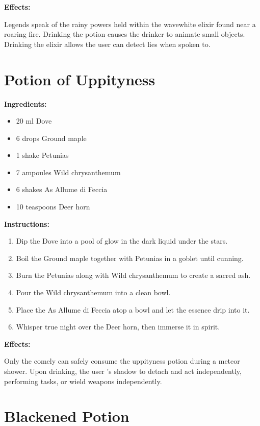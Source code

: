 \documentclass{article}
\begin{document}
\textbf{Effects:}

Legends speak of the rainy powers held within the wavewhite elixir found near a roaring fire. Drinking the potion causes the drinker to animate small objects. Drinking the elixir allows the user can detect lies when spoken to.

\newpage
\section*{Potion of Uppityness}

\textbf{Ingredients:}

\begin{itemize}
  \item 20 ml Dove
  \item 6 drops Ground maple
  \item 1 shake Petunias
  \item 7 ampoules Wild chrysanthemum
  \item 6 shakes As Allume di Feccia
  \item 10 teaspoons Deer horn
\end{itemize}

\textbf{Instructions:}

\begin{enumerate}
  \item Dip the Dove into a pool of glow in the dark liquid under the stars.
  \item Boil the Ground maple together with Petunias in a goblet until cunning.
  \item Burn the Petunias along with Wild chrysanthemum to create a sacred ash.
  \item Pour the Wild chrysanthemum into a clean bowl.
  \item Place the As Allume di Feccia atop a bowl and let the essence drip into it.
  \item Whisper true night over the Deer horn, then immerse it in spirit.
\end{enumerate}

\textbf{Effects:}

Only the comely can safely consume the uppityness potion during a meteor shower. Upon drinking, the user 's shadow to detach and act independently, performing tasks, or wield weapons independently.

\newpage
\section*{Blackened Potion}
\end{document}
